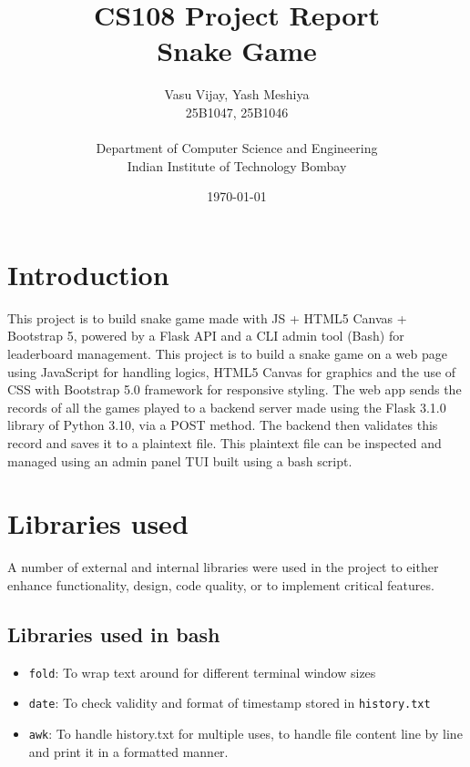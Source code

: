 \documentclass[12pt]{article}
\title{\textbf{CS108 Project Report \\ Snake Game}}
\author{
Vasu Vijay, Yash Meshiya \\ 25B1047, 25B1046 \\ \\
Department of Computer Science and Engineering \\
Indian Institute of Technology Bombay
}
\date{\today}
\begin{document}
\maketitle

\tableofcontents
\clearpage

\section{Introduction}
This project is to build snake game made with JS + HTML5 Canvas + Bootstrap 5, powered by a Flask API and a CLI admin tool (Bash) for leaderboard management.
This project is to build a snake game on a web page using JavaScript for handling logics, HTML5 Canvas for graphics and the use of CSS with Bootstrap 5.0 framework for responsive styling. The web app sends the records of all the games played to a backend server made using the Flask 3.1.0 library of Python 3.10, via a POST method. The backend then validates this record and saves it to a plaintext file. This plaintext file can be inspected and managed using an admin panel TUI built using a bash script.


\section{Libraries used}
A number of external and internal libraries were used in the project to either enhance functionality, design, code quality, or to implement critical features.\\
\subsection{Libraries used in bash}
\begin{itemize}
    \item \texttt{fold}: To wrap text around for different terminal window sizes
    \item \texttt{date}: To check validity and format of timestamp stored in \texttt{history.txt}
    \item \texttt{awk}: To handle history.txt for multiple uses, to handle file content line by line and print it in a formatted manner.
\end{itemize}
\end{document}
